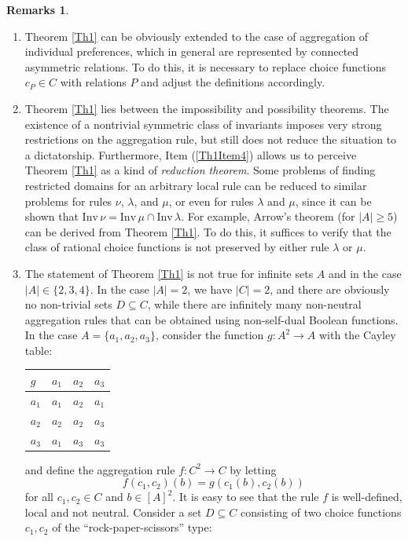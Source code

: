 \documentclass[graybox]{SNmult}
\theoremstyle{definition}
\newtheorem*{rems}{Remarks}
\begin{document}
\begin{rems}~
	\begin{enumerate}
		\item Theorem \ref{Th1} can be obviously extended to the case of aggregation of individual preferences, which in general are represented by connected asymmetric relations. To do this, it is necessary to replace choice functions $c_P\in C$ with relations $P$ and adjust the definitions accordingly.
		\item Theorem \ref{Th1} lies between the impossibility and possibility theorems. The existence of a nontrivial symmetric class of invariants imposes very strong restrictions on the aggregation rule, but still does not reduce the situation to a dictatorship. Furthermore, Item (\ref{Th1Item4}) allows us to perceive Theorem \ref{Th1} as a kind of \textit{reduction theorem}. Some problems of finding restricted domains for an arbitrary local rule can be reduced to similar problems for rules $\nu$, $\lambda$, and $\mu$, or even for rules $\lambda$ and $\mu$, since it can be shown that $\mathrm{Inv}\, \nu=\mathrm{Inv}\, \mu\cap \mathrm{Inv}\, \lambda$. For example, Arrow's theorem (for $|A|\geq 5$) can be derived from Theorem \ref{Th1}. To do this, it suffices to verify that the class of rational choice functions is not preserved by either rule $\lambda$ or $\mu$.
		\item The statement of Theorem \ref{Th1} is not true for infinite sets $A$ and in the case $|A|\in \{2, 3, 4\}$. In the case $|A|=2$, we have $|C|=2$, and there are obviously no non-trivial sets $D\subseteq C$, while there are infinitely many non-neutral aggregation rules that can be obtained using non-self-dual Boolean functions. In the case $A=\{a_1, a_2, a_3\}$, consider the function $g: A^2\to A$ with the Cayley table:
						\begin{table}[h!]\centering
			\begin{tabular}{l|l|l|l}
				$g$ &  $a_1$ & $a_2$ & $a_3$\\
				\hline
				$a_1$ &  $a_1$ & $a_2$ & $a_1$\\
				\hline
				$a_2$ &  $a_2$ & $a_2$ & $a_3$\\
				\hline
				$a_3$ &  $a_1$ & $a_3$ & $a_3$\\
			\end{tabular}
		\end{table}	
	and define the aggregation rule $f: C^2\to C$ by letting
		$$
		f(c_1, c_2)(b)=g(c_1(b), c_2(b))
		$$
		for all $c_1, c_2\in C$ and $b\in [A]^2$. It is easy to see that the rule $f$ is well-defined, local and not neutral. Consider a set $D\subseteq C$ consisting of two choice functions $c_1, c_2$ of the ``rock-paper-scissors'' type:

\end{enumerate}
\end{rems}
\end{document}
